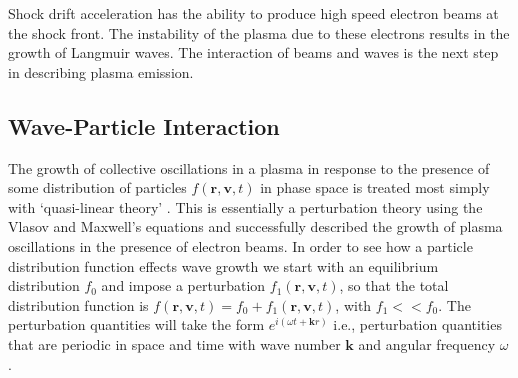 Shock drift acceleration has the ability to produce high speed electron beams at the shock front. The instability of the plasma due to these electrons results in the growth of Langmuir waves. The interaction of beams and waves is the next step in describing plasma emission.



\subsection{Wave-Particle Interaction}\label{sec:wave_particle}

The growth of collective oscillations in a plasma in response to the presence of some distribution of particles $f(\mathbf{r}, \mathbf{v}, t)$ in phase space is treated most simply with `quasi-linear theory' \citep{vedenov1963}. This is essentially a perturbation theory using the Vlasov and Maxwell's equations and successfully described the growth of plasma oscillations in the presence of electron beams. In order to see how a particle distribution function effects wave growth we start with an equilibrium distribution $f_0$ and impose a perturbation $f_1(\mathbf{r}, \mathbf{v}, t)$, so that the total distribution function is $f(\mathbf{r}, \mathbf{v}, t) = f_0 +f_1(\mathbf{r}, \mathbf{v}, t)$, with $f_1<<f_0$.  The perturbation quantities will take the form $e^{i(\omega t + \mathbf{k}r)}$ i.e., perturbation quantities that are periodic in space and time with wave number $\mathbf{k}$ and angular frequency $\omega$.

